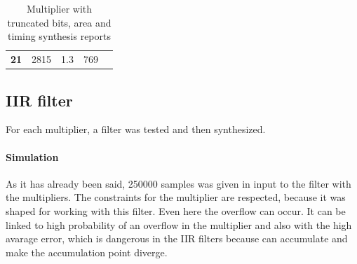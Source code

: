 \documentclass[a4paper]{article}
\begin{document}
\begin{table}[hbtp]
\begin{tabular}{|c|c|c|c|l}
		\textbf{21}                                                                  & 		2815                                                                       & 		1.3                                                                        & 		769                                                                                  &  \\ \cline{1-4}
		\end{tabular}
		\caption{Multiplier with truncated bits, area and timing synthesis reports}
		\label{tab:mult_trunc_syn}
	\end{table}

	\subsection{IIR filter}
	For each multiplier, a filter was tested and then synthesized.

	\paragraph*{Simulation} As it has already been said, 250000 samples was given in input to the filter with the multipliers. The constraints for the multiplier are respected, because it was shaped for working with this filter. 
	Even here the overflow can occur. It can be linked to high probability of an overflow in the multiplier and also with the high avarage error, which is dangerous in the IIR filters because can accumulate and make the accumulation point diverge. 
\end{document}
